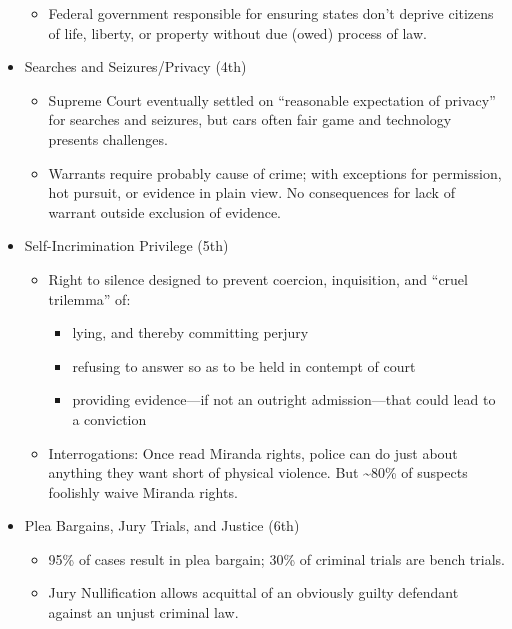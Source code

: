 \documentclass[
]{article}
\providecommand{\tightlist}{%
  \setlength{\itemsep}{0pt}\setlength{\parskip}{0pt}}
\begin{document}
\begin{itemize}
  \begin{itemize}
  \tightlist
  \item
    Federal government responsible for ensuring states don't deprive
    citizens of life, liberty, or property without due (owed) process of
    law.
  \end{itemize}
\item
  Searches and Seizures/Privacy (4th)

  \begin{itemize}
  \item
    Supreme Court eventually settled on ``reasonable expectation of
    privacy'' for searches and seizures, but cars often fair game and
    technology presents challenges.
  \item
    Warrants require probably cause of crime; with exceptions for
    permission, hot pursuit, or evidence in plain view. No consequences
    for lack of warrant outside exclusion of evidence.
  \end{itemize}
\item
  Self-Incrimination Privilege (5th)

  \begin{itemize}
  \item
    Right to silence designed to prevent coercion, inquisition, and
    ``cruel trilemma'' of:

    \begin{itemize}
    \item
      lying, and thereby committing perjury
    \item
      refusing to answer so as to be held in contempt of court
    \item
      providing evidence---if not an outright admission---that could
      lead to a conviction
    \end{itemize}
  \item
    Interrogations: Once read Miranda rights, police can do just about
    anything they want short of physical violence. But
    \textasciitilde80\% of suspects foolishly waive Miranda rights.
  \end{itemize}
\item
  Plea Bargains, Jury Trials, and Justice (6th)

  \begin{itemize}
  \item
    95\% of cases result in plea bargain; 30\% of criminal trials are
    bench trials.
  \item
    Jury Nullification allows acquittal of an obviously guilty defendant
    against an unjust criminal law.
  \end{itemize}
\end{itemize}
\end{document}
